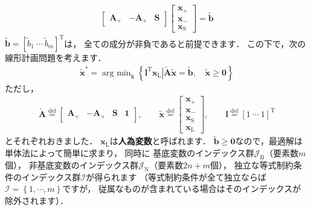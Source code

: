 ﻿\documentclass{jsarticle}
\begin{document}
\begin{align*}
\begin{bmatrix}
\boldsymbol{A}_{+} & -\boldsymbol{A}_{+} & \boldsymbol{S}
\end{bmatrix}
\begin{bmatrix}
\boldsymbol{x}_{+} \\ \boldsymbol{x}_{-} \\ \boldsymbol{x}_{\mathrm{S}}
\end{bmatrix}
=
\tilde{\boldsymbol{b}}
\end{align*}
$\tilde{\boldsymbol{b}}=\left[\tilde{b}_{1}~\cdots~\tilde{b}_{m}\right]^{\mathrm{T}}$は，
全ての成分が非負であると前提できます．
この下で，次の線形計画問題を考えます．
\begin{align*}
\tilde{\boldsymbol{x}}^{*}=\mathop{\mathrm{arg~min}}_{\tilde{\boldsymbol{x}}}\left\{
\left.
\boldsymbol{l}^{\mathrm{T}}\boldsymbol{x}_{\mathrm{L}}
\right|
\tilde{\boldsymbol{A}}\tilde{\boldsymbol{x}}=\tilde{\boldsymbol{b}}
,\quad
\tilde{\boldsymbol{x}}\geq\boldsymbol{0}
\right\}
\end{align*}
ただし，
\begin{align*}
\tilde{\boldsymbol{A}}\overset{\mathrm{def}}{=}\begin{bmatrix}
\boldsymbol{A}_{+} & -\boldsymbol{A}_{+} & \boldsymbol{S} & \boldsymbol{1}
\end{bmatrix}
,\qquad
\tilde{\boldsymbol{x}}\overset{\mathrm{def}}{=}\begin{bmatrix}
\boldsymbol{x}_{+} \\ \boldsymbol{x}_{-} \\ \boldsymbol{x}_{\mathrm{S}} \\ \boldsymbol{x}_{\mathrm{L}}
\end{bmatrix}
,\qquad
\boldsymbol{l}\overset{\mathrm{def}}{=}\left[1~\cdots~1\right]^{\mathrm{T}}
\end{align*}
とそれぞれおきました．
$\boldsymbol{x}_{\mathrm{L}}$は{\bf 人為変数}と呼ばれます．
$\tilde{\boldsymbol{b}}\geq\boldsymbol{0}$なので，最適解は単体法によって簡単に求まり，
同時に
基底変数のインデックス群$\mathcal{J}_{\mathrm{B}}$（要素数$m$個），
非基底変数のインデックス群$\mathcal{J}_{\mathrm{N}}$（要素数$2n+m$個），
独立な等式制約条件のインデックス群$\mathcal{I}$が得られます
（等式制約条件が全て独立ならば$\mathcal{I}=\left\{1,\cdots,m\right\}$ですが，
従属なものが含まれている場合はそのインデックスが除外されます）．
\end{document}
